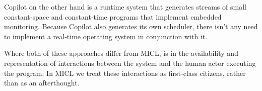\documentclass{sig-alternate-05-2015}
\begin{document}
Copilot on the other hand is a runtime system that generates streams of small
constant-space and constant-time  programs that implement embedded
monitoring. Because Copilot also generates its own scheduler, there isn't any
need to implement a real-time operating system in conjunction with it.

Where both of these approaches differ from MICL, is in the availability and
representation of interactions between the system and the human actor
executing the program. In MICL we treat these interactions as first-class
citizens, rather than as an afterthought.





\end{document}
